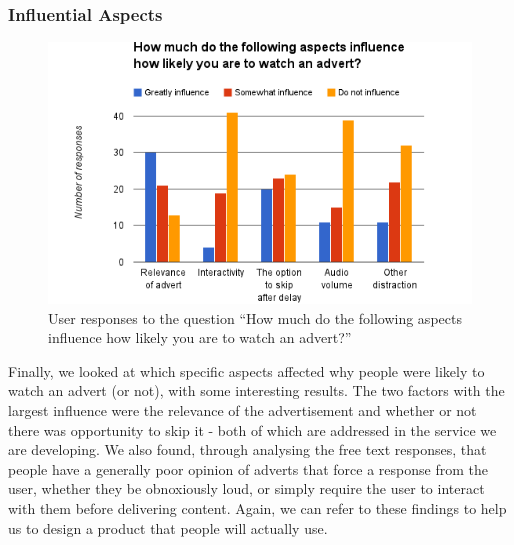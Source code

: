 \subsubsection{Influential Aspects}
\begin{figure}[H]
	\vspace{-10pt}
	\includegraphics[width=\textwidth]{images/prestudy_influence.png}
	\caption{User responses to the question ``How much do the following aspects influence how likely you are to watch an advert?''}
	\label{fig:prestudy_influence}
	\vspace{-15pt}
\end{figure}
Finally, we looked at which specific aspects affected why people were likely to watch an advert (or not), with some interesting results. The two factors with the largest influence were the relevance of the advertisement and whether or not there was opportunity to skip it - both of which are addressed in the service we are developing. We also found, through analysing the free text responses, that people have a generally poor opinion of adverts that force a response from the user, whether they be obnoxiously loud, or simply require the user to interact with them before delivering content. Again, we can refer to these findings to help us to design a product that people will actually use. 


